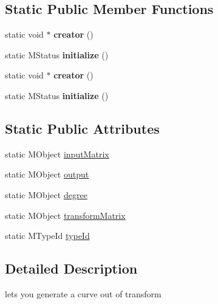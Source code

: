 \subsection*{Static Public Member Functions}
\begin{DoxyCompactItemize}
\item 
\hypertarget{class_m_g__curve_a55d53bd06193f14a0dd1b987988bb5ef}{static void $\ast$ {\bfseries creator} ()}\label{class_m_g__curve_a55d53bd06193f14a0dd1b987988bb5ef}

\item 
\hypertarget{class_m_g__curve_ac628fa6a2f76d76986121ea3f1401bc3}{static M\-Status {\bfseries initialize} ()}\label{class_m_g__curve_ac628fa6a2f76d76986121ea3f1401bc3}

\item 
\hypertarget{class_m_g__curve_a55d53bd06193f14a0dd1b987988bb5ef}{static void $\ast$ {\bfseries creator} ()}\label{class_m_g__curve_a55d53bd06193f14a0dd1b987988bb5ef}

\item 
\hypertarget{class_m_g__curve_ac628fa6a2f76d76986121ea3f1401bc3}{static M\-Status {\bfseries initialize} ()}\label{class_m_g__curve_ac628fa6a2f76d76986121ea3f1401bc3}

\end{DoxyCompactItemize}
\subsection*{Static Public Attributes}
\begin{DoxyCompactItemize}
\item 
static M\-Object \hyperlink{class_m_g__curve_a81892d761eb59f6ae72dc5455e37de26}{input\-Matrix}
\item 
static M\-Object \hyperlink{class_m_g__curve_a2e9dc1c2f81ae96e443d7ce8db7ff668}{output}
\item 
static M\-Object \hyperlink{class_m_g__curve_a3330e534c2b2d2b7db3c621af0c4d6b2}{degree}
\item 
static M\-Object \hyperlink{class_m_g__curve_a03d8b8f59871792f08bc09ad64447354}{transform\-Matrix}
\item 
static M\-Type\-Id \hyperlink{class_m_g__curve_aaefd29164297e9889c41608b8b7f2542}{type\-Id}
\end{DoxyCompactItemize}


\subsection{Detailed Description}
lets you generate a curve out of transform 

